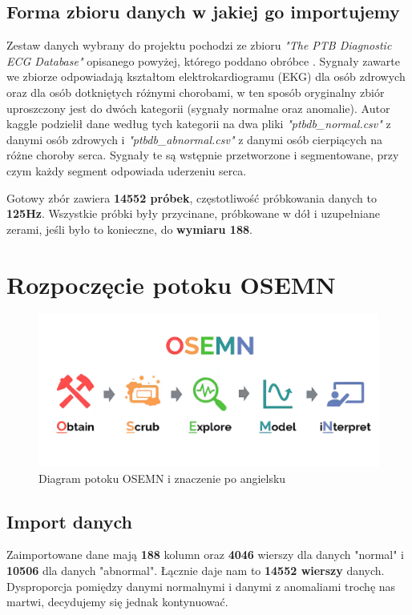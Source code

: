 \documentclass[12pt,a4paper]{article}
\begin{document}
\subsection{Forma zbioru danych w jakiej go importujemy}
Zestaw danych wybrany do projektu pochodzi ze zbioru \textit{"The PTB Diagnostic ECG Database"} opisanego powyżej, którego poddano obróbce \cite{ecg-heartbeat-categorization-dataset}. Sygnały zawarte we zbiorze odpowiadają kształtom elektrokardiogramu (EKG) dla osób zdrowych oraz dla osób dotkniętych różnymi chorobami, w ten sposób oryginalny zbiór uproszczony jest do dwóch kategorii (sygnały normalne oraz anomalie). Autor kaggle podzielił dane według tych kategorii na dwa pliki \textit{"ptbdb\_normal.csv"} z danymi osób zdrowych i \textit{"ptbdb\_abnormal.csv"} z danymi osób cierpiących na różne choroby serca. Sygnały te są wstępnie przetworzone i segmentowane, przy czym każdy segment odpowiada uderzeniu serca.

Gotowy zbór zawiera \textbf{14552 próbek}, częstotliwość próbkowania danych to \textbf{125Hz}. Wszystkie próbki były przycinane, próbkowane w dół i uzupełniane zerami, jeśli było to konieczne, do \textbf{wymiaru 188}.


\section{Rozpoczęcie potoku OSEMN}
\begin{figure}[h]
    \centering
    \includegraphics[width=1\linewidth]{images/osemn.png}
    \caption{Diagram potoku OSEMN i znaczenie po angielsku \cite{osemn}}
\end{figure}

\subsection{Import danych}
Zaimportowane dane mają \textbf{188} kolumn oraz \textbf{4046} wierszy dla danych "normal" i \textbf{10506} dla danych "abnormal". Łącznie daje nam to \textbf{14552 wierszy} danych. Dysproporcja pomiędzy danymi normalnymi i danymi z anomaliami trochę nas martwi, decydujemy się jednak kontynuować.
\end{document}
